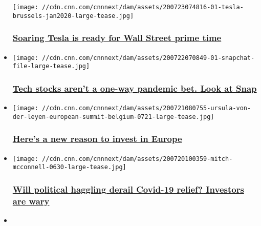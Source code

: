 \begin{itemize}
  \texttt{[image: //cdn.cnn.com/cnnnext/dam/assets/200723074816-01-tesla-brussels-jan2020-large-tease.jpg]}

  \hypertarget{soaring-tesla-is-ready-for-wall-street-prime-time}{%
  \subsubsection{\texorpdfstring{\href{/2020/07/23/investing/premarket-stocks-trading/index.html}{Soaring
  Tesla is ready for Wall Street prime
  time}}{Soaring Tesla is ready for Wall Street prime time}}\label{soaring-tesla-is-ready-for-wall-street-prime-time}}
\item
  \href{/2020/07/22/investing/premarket-stocks/index.html}{}

  \texttt{[image: //cdn.cnn.com/cnnnext/dam/assets/200722070849-01-snapchat-file-large-tease.jpg]}

  \hypertarget{tech-stocks-arent-a-one-way-pandemic-bet-look-at-snap}{%
  \subsubsection{\texorpdfstring{\href{/2020/07/22/investing/premarket-stocks/index.html}{Tech
  stocks aren't a one-way pandemic bet. Look at
  Snap}}{Tech stocks aren't a one-way pandemic bet. Look at Snap}}\label{tech-stocks-arent-a-one-way-pandemic-bet-look-at-snap}}
\item
  \href{/2020/07/21/investing/premarket-stocks-trading/index.html}{}

  \texttt{[image: //cdn.cnn.com/cnnnext/dam/assets/200721080755-ursula-von-der-leyen-european-summit-belgium-0721-large-tease.jpg]}

  \hypertarget{heres-a-new-reason-to-invest-in-europe}{%
  \subsubsection{\texorpdfstring{\href{/2020/07/21/investing/premarket-stocks-trading/index.html}{Here's
  a new reason to invest in
  Europe}}{Here's a new reason to invest in Europe}}\label{heres-a-new-reason-to-invest-in-europe}}
\item
  \href{/2020/07/20/investing/premarket-stocks-trading/index.html}{}

  \texttt{[image: //cdn.cnn.com/cnnnext/dam/assets/200720100359-mitch-mcconnell-0630-large-tease.jpg]}

  \hypertarget{will-political-haggling-derail-covid-19-relief-investors-are-wary}{%
  \subsubsection{\texorpdfstring{\href{/2020/07/20/investing/premarket-stocks-trading/index.html}{Will
  political haggling derail Covid-19 relief? Investors are
  wary}}{Will political haggling derail Covid-19 relief? Investors are wary}}\label{will-political-haggling-derail-covid-19-relief-investors-are-wary}}
\item
  \href{/2020/07/19/investing/stocks-week-ahead/index.html}{}


\end{itemize}
